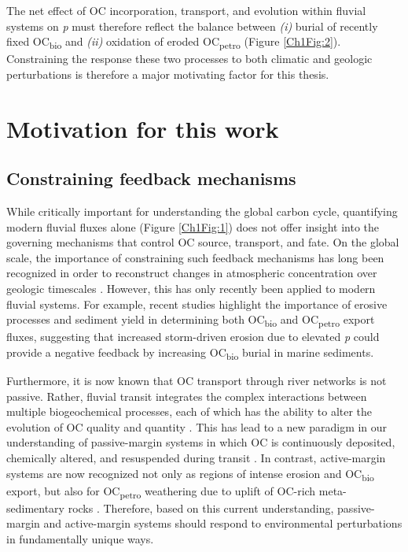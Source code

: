The net effect of OC incorporation, transport, and evolution within fluvial systems on \textit{p} must therefore reflect the balance between \textit{(i)} burial of recently fixed OC\textsubscript{bio} and \textit{(ii)} oxidation of eroded OC\textsubscript{petro} (Figure \ref{Ch1Fig:2}). Constraining the response these two processes to both climatic and geologic perturbations is therefore a major motivating factor for this thesis.

\section{Motivation for this work}

\subsection{Constraining feedback mechanisms}

While critically important for understanding the global carbon cycle, quantifying modern fluvial fluxes alone (Figure \ref{Ch1Fig:1}) does not offer insight into the governing mechanisms that control OC source, transport, and fate. On the global scale, the importance of constraining such feedback mechanisms has long been recognized in order to reconstruct changes in atmospheric  concentration over geologic timescales \citep{Berner:1999wj}. However, this has only recently been applied to modern fluvial systems. For example, recent studies \citep[\textit{e.g.}][]{Hilton:2008fo,Hilton:2012dt,Galy:2015fx} highlight the importance of erosive processes and sediment yield in determining both OC\textsubscript{bio} and OC\textsubscript{petro} export fluxes, suggesting that increased storm-driven erosion due to elevated \textit{p} could provide a negative feedback by increasing OC\textsubscript{bio} burial in marine sediments.

Furthermore, it is now known that OC transport through river networks is not passive. Rather, fluvial transit integrates the complex interactions between multiple biogeochemical processes, each of which has the ability to alter the evolution of OC quality and quantity \citep{Cole:2007gp,Aufdenkampe:2011fm,Bianchi:2011cu}. This has lead to a new paradigm in our understanding of passive-margin systems in which OC is continuously deposited, chemically altered, and resuspended during transit \citep[the so-called "river continuum"; Figure \ref{Ch1Fig:3};][]{Blair:2012du}. In contrast, active-margin systems are now recognized not only as regions of intense erosion and OC\textsubscript{bio} export, but also for OC\textsubscript{petro} weathering due to uplift of OC-rich meta-sedimentary rocks \citep[Figure \ref{Ch1Fig:3};][]{Milliman:1992fu}. Therefore, based on this current understanding, passive-margin and active-margin systems should respond to environmental perturbations in fundamentally unique ways.

